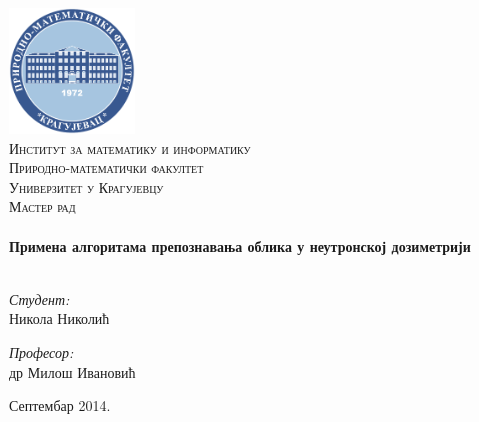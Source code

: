 %
%

\begin{titlepage}

\begin{center}

\includegraphics[width=0.25\textwidth]{logo-pmf.pdf}\\[1cm]    

\textsc{\LARGE Институт за математику и информатику
\\ Природно-математички факултет
\\ Универзитет у Крагујевцу}\\[1.5cm]

\textsc{\Large Мастер рад}\\[0.5cm]

\HRule \\[0.4cm]
{ \huge \bfseries Примена алгоритама препознавања облика у неутронској дозиметрији}\\[0.4cm]

\HRule \\[1.5cm]

\begin{minipage}{0.4\textwidth}
\begin{flushleft} \large
\emph{Студент:}\\
Никола Николић
\end{flushleft}
\end{minipage}
\begin{minipage}{0.4\textwidth}
\begin{flushright} \large
\emph{Професор:} \\
др Милош Ивановић
\end{flushright}
\end{minipage}

\vfill

{\large Септембар 2014.}

\end{center}

\end{titlepage}
